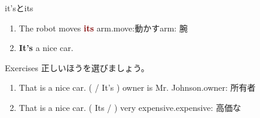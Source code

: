 \documentclass[aspectratio=169,xcolor={dvipsnames,table}]{beamer}
\begin{document}
\begin{frame}[plain]{it'sとits}
\Large
 \begin{enumerate}
  \item The robot moves \textcolor{Maroon}{\bfseries its} arm.\hfill{\scriptsize move:動かす\hspace{1\zw}arm: 腕}
  \item \textcolor{NavyBlue}{\bfseries It's} a nice car.
 \end{enumerate}
\normalsize

\vfill

\end{frame}
\begin{frame}[plain]{Exercises}
 正しいほうを選びましょう。

 \begin{enumerate}
  \item That is a nice car. (  / It's ) owner is Mr. Johnson.\hfill{\scriptsize owner: 所有者}
  \item That is a nice car. (  Its /  ) very expensive.\hfill{\scriptsize expensive: 高価な}
 \end{enumerate}

\vfill

\hfill{}
\end{frame}

\end{document}

